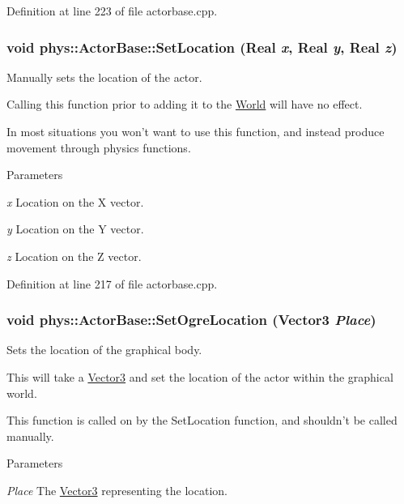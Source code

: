 Definition at line 223 of file actorbase.cpp.

\hypertarget{classphys_1_1ActorBase_a0b0db2ec0f4926326635b86f1ead2276}{
\subsubsection[{SetLocation}]{\setlength{\rightskip}{0pt plus 5cm}void phys::ActorBase::SetLocation ({\bf Real} {\em x}, \/  {\bf Real} {\em y}, \/  {\bf Real} {\em z})}}
\label{d8/d0f/classphys_1_1ActorBase_a0b0db2ec0f4926326635b86f1ead2276}


Manually sets the location of the actor. 

Calling this function prior to adding it to the \hyperlink{classphys_1_1World}{World} will have no effect. \par
 In most situations you won't want to use this function, and instead produce movement through physics functions. 
\begin{DoxyParams}{Parameters}
\item[{\em x}]Location on the X vector. \item[{\em y}]Location on the Y vector. \item[{\em z}]Location on the Z vector. \end{DoxyParams}


Definition at line 217 of file actorbase.cpp.

\hypertarget{classphys_1_1ActorBase_a192ced7c3191f3f9d4921aad73952046}{
\subsubsection[{SetOgreLocation}]{\setlength{\rightskip}{0pt plus 5cm}void phys::ActorBase::SetOgreLocation ({\bf Vector3} {\em Place})}}
\label{d8/d0f/classphys_1_1ActorBase_a192ced7c3191f3f9d4921aad73952046}


Sets the location of the graphical body. 

This will take a \hyperlink{classphys_1_1Vector3}{Vector3} and set the location of the actor within the graphical world. \par
 This function is called on by the SetLocation function, and shouldn't be called manually. 
\begin{DoxyParams}{Parameters}
\item[{\em Place}]The \hyperlink{classphys_1_1Vector3}{Vector3} representing the location. \end{DoxyParams}


